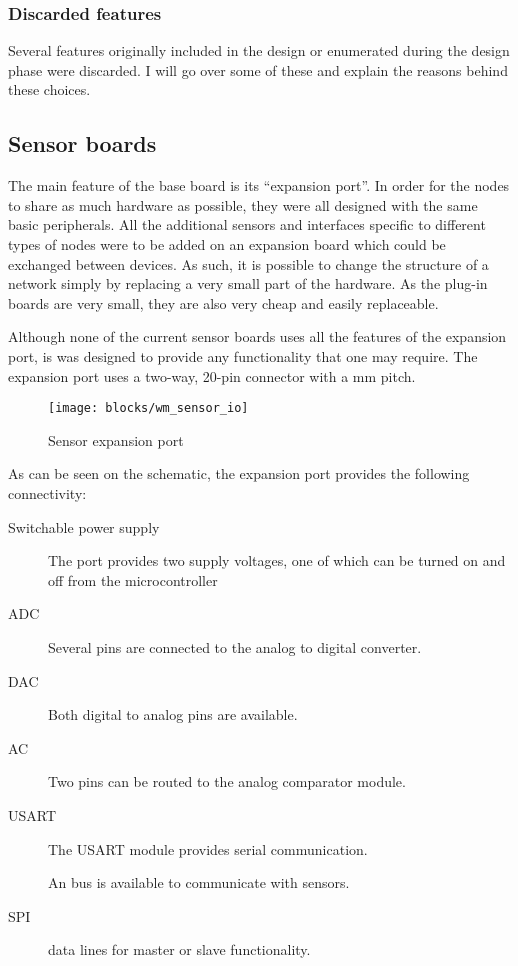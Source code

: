 \subsubsection{Discarded features}

Several features originally included in the design or enumerated during the
design phase were discarded. I will go over some of these and explain the
reasons behind these choices.


\subsection{Sensor boards}

The main feature of the base board is its ``expansion port''. In order for the
nodes to share as much hardware as possible, they were all designed with the
same basic peripherals. All the additional sensors and interfaces specific to
different types of nodes were to be added on an expansion board which could be
exchanged between devices. As such, it is possible to change the structure of a
network simply by replacing a very small part of the hardware. As the plug-in
boards are very small, they are also very cheap and easily replaceable.

Although none of the current sensor boards uses all the features of the
expansion port, is was designed to provide any functionality that one may
require. The expansion port uses a two-way, 20-pin connector with a \unit[2]{mm}
pitch.

\begin{figure}[!h]
  \begin{center}
    \texttt{[image: blocks/wm\_sensor\_io]}
  \end{center}
  \caption{Sensor expansion port}
  \label{fig:sensor-io}
\end{figure}

As can be seen on the schematic, the expansion port provides the following
connectivity:
\begin{description}
  \item [Switchable power supply] The port provides two supply voltages, one of
    which can be turned on and off from the microcontroller
  \item[ADC] Several pins are connected to the analog to digital converter.
  \item[DAC] Both digital to analog pins are available.
  \item[AC] Two pins can be routed to the analog comparator module.
  \item[USART] The USART module provides serial communication.
  \item[\IIC{}] An \IIC{} bus is available to communicate with sensors.
  \item[SPI] data lines for master or slave functionality.
\end{description}

